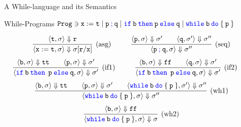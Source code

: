 \documentclass{beamer}
\newcommand{\blue}[1]{\textcolor{blue}{#1}}
\begin{document}
\begin{frame}{A While-language and its Semantics}
	\begin{block}{While-Programs}
	        $\mathtt{Prog} \ni \mathtt{x := t} \mid
	        \mathtt{p \> \blue{;} \> q} \mid
	        \mathtt{\blue{if} \> b \> \blue{then} \> p \> \blue{else} \> q} \mid
	        \mathtt{\blue{while} \> b \> \blue{do} \> \{ \> p \> \}}$
        \end{block} \vspace{-0.4cm}
        \[
                \infer[(\text{asg})]{
                        \langle \mathtt{x := t}, \sigma \rangle \Downarrow 
                        \sigma[\mathtt{r} / \mathtt{x}]
                }{
                       \langle \mathtt{t}, \sigma \rangle \Downarrow \mathtt{r}
                } \hspace{1cm}
                \infer[(\text{seq})]{
                        \langle \mathtt{p \> \blue{;} \> q}, \sigma \rangle \Downarrow \sigma''
                }{
                        \langle \mathtt{p}, \sigma \rangle \Downarrow \sigma' \qquad
                        \langle \mathtt{q}, \sigma' \rangle \Downarrow \sigma'' 
                }
        \]\vspace{0.001cm}
        \[\hspace{-0.6cm}
                \infer[(\text{if1})]{
                        \langle \mathtt{\blue{if} \> b \> \blue{then} \> \> p \> \blue{else} \> q}, 
                        \sigma \rangle \Downarrow \sigma'
                }{
                        \langle \mathtt{b}, \sigma \rangle \Downarrow \mathtt{tt} \qquad
                        \langle \mathtt{p}, \sigma \rangle \Downarrow \sigma'
                } \hspace{1cm} 
                \infer[(\text{if2})]{
                        \langle \mathtt{\blue{if} \> b \> \blue{then} \> \> p \> \blue{else} \> q}, 
                        \sigma \rangle \Downarrow \sigma'
                }{
                        \langle \mathtt{b}, \sigma \rangle \Downarrow \mathtt{ff} \qquad
                        \langle \mathtt{q}, \sigma \rangle \Downarrow \sigma'
                } 
        \]\vspace{0.001cm}
        \[
                \infer[(\text{wh1})]{
                        \langle \mathtt{\blue{while} \> b \> \blue{do} \> \{ \> p \> \}}, \sigma \rangle
                        \Downarrow \sigma''
                }{
                        \langle \mathtt{b}, \sigma \rangle \Downarrow \mathtt{tt} \qquad
                        \langle \mathtt{p}, \sigma \rangle \Downarrow \sigma' \qquad
                        \langle \mathtt{\blue{while} \> b \> \blue{do} \> \{ \> p \> \}}, \sigma'
                        \rangle \Downarrow \sigma'' 
                }
        \]\vspace{0.001cm}
        \[
                \infer[(\text{wh2})]{
                        \langle \mathtt{\blue{while} \> b \> \blue{do} \> \{ \> p \> \}}, \sigma \rangle
                        \Downarrow \sigma
                }{
                        \langle \mathtt{b}, \sigma \rangle \Downarrow \mathtt{ff}
                }
        \]
\end{frame}
\end{document}

